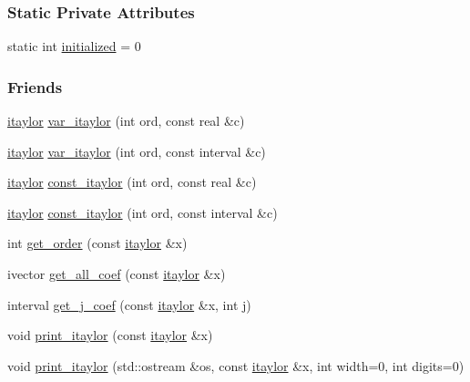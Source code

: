 \subsubsection*{\-Static \-Private \-Attributes}
\begin{DoxyCompactItemize}
\item 
static int \hyperlink{classtaylor_1_1itaylor_acf103bcde03b0ace044510e116ab3805}{initialized} = 0
\end{DoxyCompactItemize}
\subsubsection*{\-Friends}
\begin{DoxyCompactItemize}
\item 
\hyperlink{classtaylor_1_1itaylor}{itaylor} \hyperlink{classtaylor_1_1itaylor_ad529aabfd4ddb7a266ac5398382a880e}{var\-\_\-itaylor} (int ord, const real \&c)
\item 
\hyperlink{classtaylor_1_1itaylor}{itaylor} \hyperlink{classtaylor_1_1itaylor_ad844d06e1838d2d4ddb723d8a3863591}{var\-\_\-itaylor} (int ord, const interval \&c)
\item 
\hyperlink{classtaylor_1_1itaylor}{itaylor} \hyperlink{classtaylor_1_1itaylor_a5b0cf952f2ef0ca4bc353c461235be0c}{const\-\_\-itaylor} (int ord, const real \&c)
\item 
\hyperlink{classtaylor_1_1itaylor}{itaylor} \hyperlink{classtaylor_1_1itaylor_ab14712ac0c9330a71023eb14964e34c8}{const\-\_\-itaylor} (int ord, const interval \&c)
\item 
int \hyperlink{classtaylor_1_1itaylor_a8a5c0c9343498de2b294fb171605a9ab}{get\-\_\-order} (const \hyperlink{classtaylor_1_1itaylor}{itaylor} \&x)
\item 
ivector \hyperlink{classtaylor_1_1itaylor_abd988b0bc6f50a3a888d43e4008d5d1e}{get\-\_\-all\-\_\-coef} (const \hyperlink{classtaylor_1_1itaylor}{itaylor} \&x)
\item 
interval \hyperlink{classtaylor_1_1itaylor_a4f1cabe655848691aae55aa9e81744e1}{get\-\_\-j\-\_\-coef} (const \hyperlink{classtaylor_1_1itaylor}{itaylor} \&x, int j)
\item 
void \hyperlink{classtaylor_1_1itaylor_ad4ee00a6eb0637b14de2995b8a3cd214}{print\-\_\-itaylor} (const \hyperlink{classtaylor_1_1itaylor}{itaylor} \&x)
\item 
void \hyperlink{classtaylor_1_1itaylor_a379a4a17eb84752d9a16e1e1b5343230}{print\-\_\-itaylor} (std\-::ostream \&os, const \hyperlink{classtaylor_1_1itaylor}{itaylor} \&x, int width=0, int digits=0)

\end{DoxyCompactItemize}
